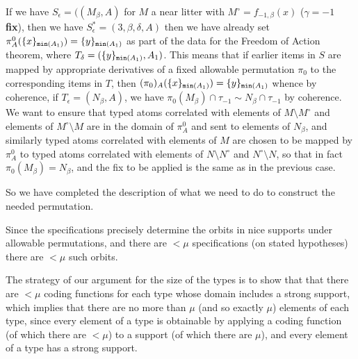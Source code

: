 \documentclass[112pt]{article}
\begin{document}
\begin{description}
If we have $S_\epsilon= ((M_\beta,A)$ for $M$ a near litter with $M^\circ = f_{-1,\beta}(x)$ ({\bf $\gamma= -1$ fix}),  then we have $S^*_\epsilon = (3,\beta,\delta,A)$ then we have already set $\pi^0_A(\{x\}_{{\tt min}(A_1)}) = \{y\}_{{\tt min}(A_1)}$ as part of the data for the Freedom of Action theorem, where
$T_\delta = (\{y\}_{{\tt min}(A_1)},A_1)$.  This means that if earlier items in $S$ are mapped by appropriate derivatives of a fixed allowable permutation $\pi_0$ to the corresponding items in $T$, then $(\pi_0)_A(\{x\}_{{\tt min}(A_1)}) = \{y\}_{{\tt min}(A_1)}$ whence by coherence, if $T_\epsilon = (N_\beta,A)$, we have
$\pi_0(M_\beta) \cap \tau_{-1} \sim N_\beta \cap \tau_{-1}$ by coherence.  We want to ensure that typed atoms correlated with elements of $M \setminus M^{\circ}$ and elements of $M^{\circ} \setminus M$ are in the domain of $\pi^0_A$ and sent to elements of $N_\beta$, and similarly typed atoms correlated with elements of $M$ are chosen to be mapped by $\pi^0_A$ to typed atoms correlated with elements of $N\setminus N^\circ$ and $N^\circ \setminus N$,
so that in fact $\pi_0(M_\beta) = N_\beta$, and the fix to be applied is the same as in the previous case.

So we have completed the description of what we need to do to construct the needed permutation.

\end{description}

Since the specifications precisely determine the orbits in nice supports under allowable permutations, and there are $<\mu$ specifications
(on stated hypotheses) there are $<\mu$ such orbits.

The strategy of our argument for the size of the types is to show that that there are $<\mu$ coding functions for each type whose domain includes a strong support, which implies that there are no more than $\mu$ (and so exactly $\mu$) elements of each type, since every element of a type is obtainable by applying a coding function (of which there are $<\mu$) to a support (of which there are $\mu$), and every element of a type has a strong support.
\end{document}
